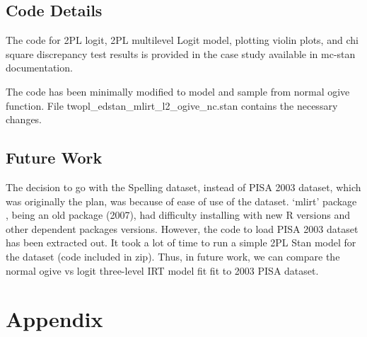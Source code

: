 \documentclass[12pt]{article}
\begin{document}
\subsection{Code Details}

The code for 2PL logit, 2PL multilevel Logit model, plotting violin plots, and chi square discrepancy test results is provided in the case study \cite{furr2016two} available in mc-stan documentation.

The code has been minimally modified to model and sample from normal ogive function.
File twopl\_edstan\_mlirt\_l2\_ogive\_nc.stan contains the necessary changes.

\subsection{Future Work}

The decision to go with the Spelling dataset, instead of PISA 2003 dataset, which was originally the plan, was because of ease of use of the dataset. `mlirt' package \cite{fox2007multilevel}, being an old package (2007), had difficulty installing with new R versions and other dependent packages versions. However, the code to load PISA 2003 dataset has been extracted out. It took a lot of time to run a simple 2PL Stan model for the dataset (code included in zip). Thus, in future work, we can compare the normal ogive vs logit three-level IRT model fit fit to 2003 PISA dataset.




\newpage
\section*{Appendix}
\end{document}
